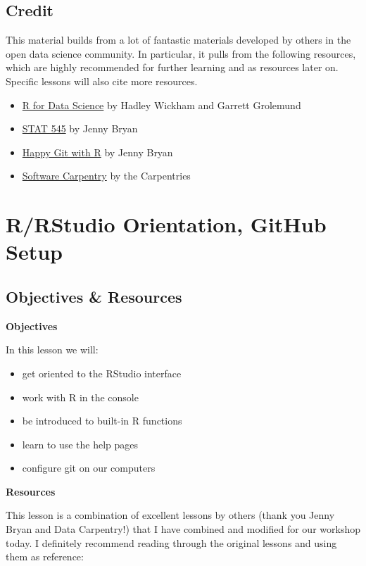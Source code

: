 \documentclass[]{book}
\providecommand{\tightlist}{%
  \setlength{\itemsep}{0pt}\setlength{\parskip}{0pt}}
\theoremstyle{definition}
\theoremstyle{definition}
\theoremstyle{definition}
\theoremstyle{remark}
\begin{document}
\section{Credit}\label{credit}

This material builds from a lot of fantastic materials developed by
others in the open data science community. In particular, it pulls from
the following resources, which are highly recommended for further
learning and as resources later on. Specific lessons will also cite more
resources.

\begin{itemize}
\tightlist
\item
  \href{http://r4ds.had.co.nz/}{R for Data Science} by Hadley Wickham
  and Garrett Grolemund
\item
  \href{http://stat545.com/}{STAT 545} by Jenny Bryan
\item
  \href{http://happygitwithr.com}{Happy Git with R} by Jenny Bryan
\item
  \href{https://software-carpentry.org/lessons/}{Software Carpentry} by
  the Carpentries
\end{itemize}

\chapter{R/RStudio Orientation, GitHub Setup}\label{orientation}

\section{Objectives \& Resources}\label{objectives-resources}

\textbf{Objectives}

In this lesson we will:

\begin{itemize}
\tightlist
\item
  get oriented to the RStudio interface
\item
  work with R in the console
\item
  be introduced to built-in R functions
\item
  learn to use the help pages
\item
  configure git on our computers
\end{itemize}

\textbf{Resources}

This lesson is a combination of excellent lessons by others (thank you
Jenny Bryan and Data Carpentry!) that I have combined and modified for
our workshop today. I definitely recommend reading through the original
lessons and using them as reference:
\end{document}
